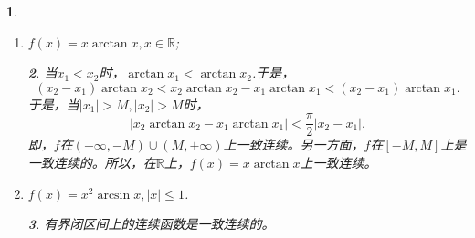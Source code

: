 \documentclass[utf8]{book}
\newtheorem{example}{}[section]             %
\newtheorem{solution}{}
\begin{document}
\begin{example}
\begin{enumerate}
\begin{solution}
\begin{equation*}
\begin{split}
&<(x_1-x_2)+2x_2\sin{\left(\frac{1}{2}\cdot\left[\frac{1}{x_1}+\frac{1}{x_2}\right]\right)}\cdot\sin{\left(\frac{1}{2}\cdot\left[\frac{1}{x_2}-\frac{1}{x_1}\right]\right)}\\
&<(x_1-x_2)+2x_2\frac{x_1-x_2}{2x_1x_2}\\
&<2(x_1-x_2)
\end{split}
\end{equation*}
由此可见，$F(x)$在区间$(1, +\infty)$上一致连续。另一方面，$F(x)$在$[0,1]$上连续，从而一致连续。所以，$F(x)$在$[0,+\infty)$上一致连续。从而$f(x) = F(x)\big{|}_{(0,+\infty)}$是一致连续的。
\end{solution}
\item $f(x) = x\arctan{x}, x\in\mathbb{R}$;
\begin{solution}
当$x_1 < x_2$时，$\arctan{x_1} < \arctan{x_2}$.于是，
$$(x_2-x_1)\arctan{x_2} < x_2\arctan{x_2} - x_1\arctan{x_1} < (x_2-x_1)\arctan{x_1}.$$ 于是，当$|x_1| > M, |x_2| > M$时，
$$|x_2\arctan{x_2} - x_1\arctan{x_1}| < \frac{\pi}{2}|x_2-x_1|.$$
即，$f$在$(-\infty, -M)\cup(M, +\infty)$上一致连续。另一方面，$f$在$[-M, M]$上是一致连续的。所以，在$\mathbb{R}$上，$f(x) = x\arctan{x}$上一致连续。
\end{solution}
\item $f(x)=x^2\arcsin{x}, |x|\leq 1$.
\begin{solution}
有界闭区间上的连续函数是一致连续的。
\end{solution}
\end{enumerate}
\end{example}
\end{document}
